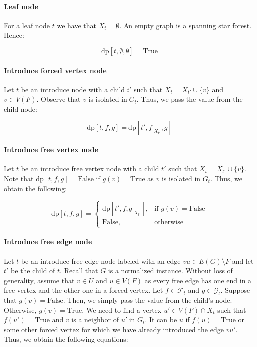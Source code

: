 \documentclass[en]{pracamgr}
\theoremstyle{definition}
\newcommand{\dpt}[1]{\textrm{dp}[#1]}
\newcommand{\true}{\textrm{True}}
\newcommand{\false}{\textrm{False}}
\begin{document}
\paragraph{Leaf node} For a leaf node $t$ we have that $X_t=\emptyset$. An empty graph is a spanning star forest. Hence:

\begin{equation*}
	\dpt{t,\emptyset,\emptyset}=\true
\end{equation*}

\paragraph{Introduce forced vertex node} Let $t$ be an introduce node with a child $t'$ such that $X_t = X_{t'} \cup \{v\}$ and $v \in V(F)$. Observe that $v$ is isolated in $G_t$. Thus, we pass the value from the child node:

\begin{equation*}
	\dpt{t,f,g}= \dpt{t',f|_{X_{t'}},g}
\end{equation*}

\paragraph{Introduce free vertex node} Let $t$ be an introduce free vertex node with a child $t'$ such that $X_t = X_{t'} \cup \{v\}$. Note that $\dpt{t,f,g}=\false$ if $g(v)=\true$ as $v$ is isolated in $G_t$. Thus, we obtain the following:

\begin{equation*}
	\dpt{t,f,g} =
	\begin{cases}
		\dpt{t',f,g|_{X_{t'}}}, & \text{if $g(v)=\false$} \\
		\false, &\text{otherwise}
	\end{cases}
\end{equation*}

\paragraph{Introduce free edge node} Let $t$ be an introduce free edge node labeled with an edge $vu \in E(G) \setminus F$ and let $t'$ be the child of $t$. Recall that $G$ is a normalized instance. Without loss of generality, assume that $v \in U$ and $u \in V(F)$ as every free edge has one end in a free vertex and the other one in a forced vertex. Let $f \in \mathcal{F}_t$ and $g \in \mathcal{G}_t$. Suppose that $g(v)=\false$. Then, we simply pass the value from the child's node. Otherwise, $g(v)=\true$. We need to find a vertex $u' \in V(F) \cap X_t$ such that $f(u')=\true$ and $v$ is a neighbor of $u'$ in $G_t$. It can be $u$ if $f(u)=\true$ or some other forced vertex for which we have already introduced the edge $vu'$. Thus, we obtain the following equations:
\end{document}
